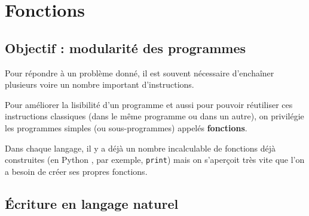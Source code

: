\section{Fonctions}
\subsection{Objectif : modularité des programmes}

Pour répondre à un problème donné, il est souvent nécessaire d'enchaîner plusieurs voire un nombre 
important d'instructions.

Pour améliorer la lisibilité d'un programme et aussi pour pouvoir réutiliser 
ces instructions classiques (dans le même programme ou dans un autre),
on privilégie les programmes simples (ou sous-programmes) appelés \textbf{fonctions}.

Dans chaque langage, il y a déjà un nombre incalculable de fonctions déjà construites (en Python , 
par exemple, \texttt{print}) mais on s'aperçoit très vite que l'on a besoin de créer ses propres 
fonctions.


\subsection{\'Ecriture en langage naturel}


